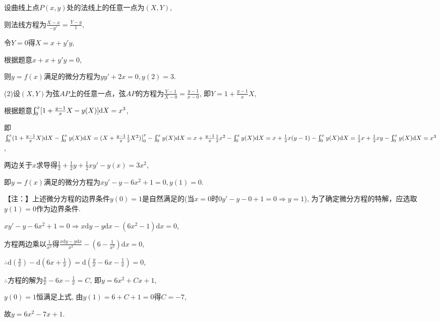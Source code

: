 \documentclass[12pt,UTF8]{ctexart}
\newcommand{\Int}[4]{\varint\nolimits_{#1}^{#2}#3\mathrm d#4}
\newcommand{\md}[1]{\mathrm d#1}
\begin{document}
\begin{enumerate}
设曲线上点$P(x,y)$处的法线上的任意一点为$(X,Y)$,

则法线方程为$\frac{X-x}{-y'}=\frac{Y-y}1$,

令$Y=0$得$X=x+y'y$,

根据题意$x+x+y'y=0$,

则$y=f(x)$满足的微分方程为$yy'+2x=0,y(2)=3$.

(2)设$(X,Y)$为弦$AP$上的任意一点，弦$AP$的方程为$\frac{Y-1}{X-0}=\frac{y-1}{x-0}$, 即$Y=1+\frac{y-1}xX$,

根据题意$\Int0x{[1+\frac{y-1}xX-y(X)]}X=x^3$,

即$\Int0x{(1+\frac{y-1}xX)}X-\Int0x{y(X)}X=(X+\frac{y-1}x\frac12X^2)\big|_0^x-\Int0x{y(X)}X\\
=x+\frac{y-1}x\frac12x^2-\Int0x{y(X)}X=x+\frac12x(y-1)-\Int0x{y(X)}X=\frac12x+\frac12xy-\Int0x{y(X)}X=x^3$,

两边关于$x$求导得$\frac12+\frac12y+\frac12xy'-y(x)=3x^2$,

即$y=f(x)$满足的微分方程为$xy'-y-6x^2+1=0, y(1)=0$.

【注：】上述微分方程的边界条件$y(0)=1$是自然满足的(当$x=0$时$0y'-y-0+1=0\Rightarrow y=1$), 为了确定微分方程的特解，应选取$y(1)=0$作为边界条件.

$xy'-y-6x^2+1=0\Rightarrow x\md y-y\md x-(6x^2-1)\md x=0$,

方程两边乘以$\frac1{x^2}$得$\frac{x\md y-y\md x}{x^2}-(6-\frac1{x^2})\md x=0$,

$\therefore\md(\frac yx)-\md(6x+\frac1x)=\md(\frac yx-6x-\frac1x)=0$,

$\therefore$方程的解为$\frac yx-6x-\frac1x=C$, 即$y=6x^2+Cx+1$,

$y(0)=1$恒满足上式, 由$y(1)=6+C+1=0$得$C=-7$,

故$y=6x^2-7x+1$.
\end{enumerate}
\end{document}
